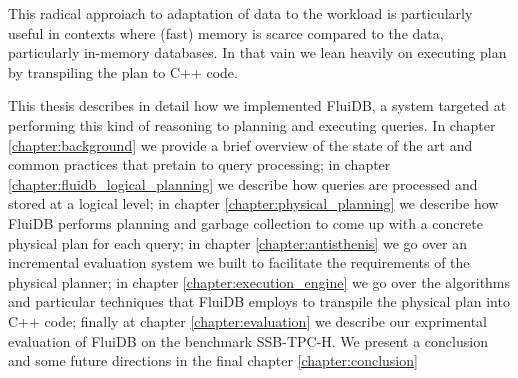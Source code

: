 This radical approiach to adaptation of data to the workload is
particularly useful in contexts where (fast) memory is scarce compared
to the data, particularly in-memory databases. In that vain we lean
heavily on executing plan by transpiling the plan to C++ code.

This thesis describes in detail how we implemented FluiDB, a system
targeted at performing this kind of reasoning to planning and
executing queries. In chapter \ref{chapter:background} we provide a
brief overview of the state of the art and common practices that
pretain to query processing; in chapter
\ref{chapter:fluidb_logical_planning} we describe how queries are
processed and stored at a logical level; in chapter
\ref{chapter:physical_planning} we describe how FluiDB performs
planning and garbage collection to come up with a concrete physical
plan for each query; in chapter \ref{chapter:antisthenis} we go over
an incremental evaluation system we built to facilitate the
requirements of the physical planner; in chapter
\ref{chapter:execution_engine} we go over the algorithms and
particular techniques that FluiDB employs to transpile the physical
plan into C++ code; finally at chapter \ref{chapter:evaluation} we
describe our exprimental evaluation of FluiDB on the benchmark
SSB-TPC-H. We present a conclusion and some future directions in the
final chapter \ref{chapter:conclusion}
